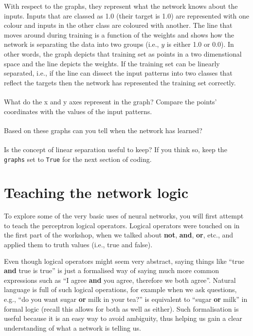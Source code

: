 \documentclass[a4paper,10pt]{article}
\begin{document}
With respect to the graphs, they represent what the network knows about the inputs. Inputs that are classed as 1.0 (their target is 1.0) are represented with one colour and inputs in the other class are coloured with another. The line that moves around during training is a function of the weights and shows how the network is separating the data into two groups (i.e., $y$ is either 1.0 or 0.0). In other words, the graph depicts that training set as points in a two dimenstional space and the line depicts the weights. If the training set can be linearly separated, i.e., if the line can dissect the input patterns into two classes that reflect the targets then the network has represented the training set correctly.
\ \\ 
\ \\ 
What do the x and y axes represent in the graph? Compare the points' coordinates with the values of the input patterns.
\ \\ 
\ \\ 
Based on these graphs can you tell when the network has learned?
\ \\ 
\ \\
Is the concept of linear separation useful to keep? If you think so, keep the \texttt{graphs} set to \texttt{True} for the next section of coding.


\section{Teaching the network logic}
To explore some of the  very basic uses of neural networks, you will first attempt to teach the perceptron logical operators. Logical operators were touched on in the first part of the workshop, when we talked about \textbf{not}, \textbf{and}, \textbf{or}, etc., and applied them to truth values (i.e., true and false).

Even though logical operators might seem very abstract, saying things like ``true \textbf{and} true is true'' is just a formalised way of saying much more common expressions such as ``I agree \textbf{and} you agree, therefore we both agree''. Natural language is full of such logical operations, for example when we ask questions, e.g., ``do you want sugar \textbf{or} milk in your tea?'' is equivalent to ``sugar \textbf{or} milk'' in formal logic (recall this allows for both as well as either). Such formalisation is useful because it is an easy way to avoid ambiguity, thus helping us gain a clear understanding of what a network is telling us. 
\end{document}
